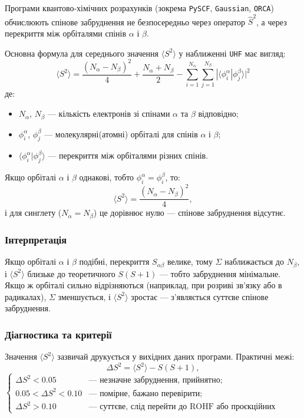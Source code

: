 Програми квантово-хімічних розрахунків (зокрема \texttt{PySCF}, \texttt{Gaussian}, \texttt{ORCA}) обчислюють спінове забруднення не безпосередньо через оператор $\hat{S}^2$, а через перекриття між орбіталями спінів $\alpha$ і $\beta$.

Основна формула для середнього значення $\langle S^2 \rangle$ у наближенні \texttt{UHF} має вигляд:
\[
\boxed{
\langle S^2 \rangle =
\frac{(N_\alpha - N_\beta)^2}{4}
+ \frac{N_\alpha + N_\beta}{2}
- \sum_{i=1}^{N_\alpha} \sum_{j=1}^{N_\beta}
|\langle \phi_i^\alpha | \phi_j^\beta \rangle|^2
}
\]
де:
\begin{itemize}
    \item $N_\alpha$, $N_\beta$ — кількість електронів зі спінами $\alpha$ та $\beta$ відповідно;
    \item $\phi_i^\alpha$, $\phi_j^\beta$ --- молекулярні(атомні) орбіталі для спінів $\alpha$ і $\beta$;
    \item $\langle \phi_i^\alpha | \phi_j^\beta \rangle$ --- перекриття між орбіталями різних спінів.
\end{itemize}

Якщо орбіталі $\alpha$ і $\beta$ однакові, тобто $\phi_i^\alpha = \phi_i^\beta$, то:
\[
\langle S^2 \rangle = \frac{(N_\alpha - N_\beta)^2}{4},
\]
і для синглету ($N_\alpha = N_\beta$) це дорівнює нулю --- спінове забруднення відсутнє.

\subsubsection*{Інтерпретація}

Якщо орбіталі $\alpha$ і $\beta$ подібні, перекриття $S_{\alpha\beta}$ велике, тому $\Sigma$ наближається до $N_\beta$, і $\langle S^2 \rangle$ близьке до теоретичного $S(S+1)$ — тобто забруднення мінімальне.
Якщо ж орбіталі сильно відрізняються (наприклад, при розриві зв’язку або в радикалах), $\Sigma$ зменшується, і $\langle S^2 \rangle$ зростає — з’являється суттєве спінове забруднення.


\subsubsection*{Діагностика та критерії}

Значення $\langle S^2 \rangle$ зазвичай друкується у вихідних даних програми.
Практичні межі:
\[
\Delta S^2 = \langle S^2 \rangle - S(S+1),
\]
\[
\begin{cases}
\Delta S^2 < 0.05 & \text{— незначне забруднення, прийнятно;}\\
0.05 < \Delta S^2 < 0.10 & \text{— помірне, бажано перевірити;}\\
\Delta S^2 > 0.10 & \text{— суттєве, слід перейти до ROHF або проєкційних методів.}
\end{cases}
\]


